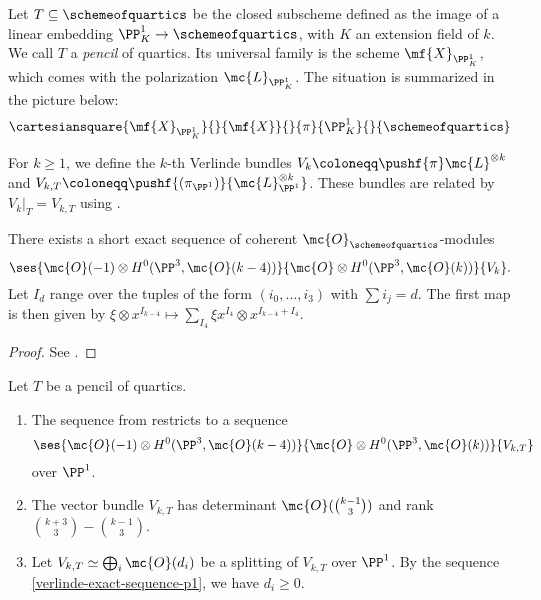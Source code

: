 Let $T \subseteq \schemeofquartics$ be the closed subscheme defined as the image of a linear embedding
$\PP^1_K\to \schemeofquartics$, with $K$ an extension field of $k$.
We call $T$ a \emph{pencil} of quartics. Its universal family is the scheme
$\mf{X}_{\PP^1_K}$, which comes with the polarization
$\mc{L}_{\PP^1_K}$. The situation is summarized in the picture below:
\[
\cartesiansquare{\mf{X}_{\PP^1_K}}{}{\mf{X}}
				  {}  {\pi}
				  {\PP^1_K}{}{\schemeofquartics}
\]	
\begin{definition}For $k\geq 1$, we define the $k$-th Verlinde bundles
$V_k \coloneqq \pushf{\pi}\mc{L}^{\otimes k}$
and
$V_{k,T} \coloneqq \pushf{(\pi_{\PP^1})}{\mc{L}_{\PP^1}^{\otimes k}}$.
These bundles are related by
$V_{k}|_T = V_{k,T}$
using .
\end{definition}

\begin{proposition} \label{verlinde-exact-sequence}
	There exists a short exact sequence of coherent
	$\mc{O}_{\schemeofquartics}$-modules 
	\[
	\ses{\mc{O}(-1) \otimes H^0(\PP^3, \mc{O}(k-4))}
	    {\mc{O} \otimes H^0(\PP^3, \mc{O}(k))}
	    {V_k}.
	\]
	Let $I_d$ range over the tuples of the form
	$(i_0,\dotsc,i_3)$
	with
	$\sum i_j = d$.
	The first map is then given by 
	$\xi \otimes x^{I_{k-4}}
	\mapsto
	\sum_{I_4} \xi x^{I_4} \otimes x^{I_{k-4}+I_4}$.   
	\end{proposition}

\begin{proof}
	See \cite[Proposition 4.2]{hemminghaus-verlinde-bundles}.
\end{proof}

\begin{remark}
	Let $T$ be a pencil of quartics.

	\begin{enumerate}
	\item The sequence from  restricts to a sequence
	\begin{equation} \label{verlinde-exact-sequence-p1}
	\ses{\mc{O}(-1) \otimes H^0(\PP^3, \mc{O}(k-4))}
	    {\mc{O} \otimes H^0(\PP^3, \mc{O}(k))}
	    {V_{k,T}}
	\end{equation}
	over $\PP^1$.

	\item The vector bundle $V_{k,T}$ has determinant $\mc{O}(\binom{k-1}{3})$ and rank $\binom{k+3}{3} - \binom{k-1}{3}$.

	\item Let $V_{k,T} \simeq \bigoplus_i \mc{O}(d_i)$ be a splitting of $V_{k,T}$ over $\PP^1$. By the sequence \cref{verlinde-exact-sequence-p1}, we have $d_i \geq 0$.
	\end{enumerate}
\end{remark}

